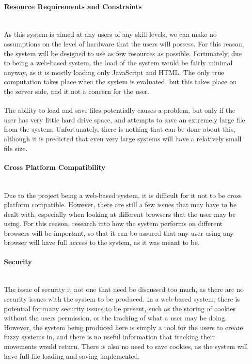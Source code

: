 \paragraph{Resource Requirements and Constraints}\ \\
As this system is aimed at any users of any skill levels, we can make no assumptions on the level of hardware that the users will possess. For this reason, the system will be designed to use as few resources as possible. Fortunately, due to being a web-based system, the load of the system would be fairly minimal anyway, as it is mostly loading only JavaScript and HTML. The only true computation takes place when the system is evaluated, but this takes place on the server side, and it not a concern for the user.\ \\
\ \\
The ability to load and save files potentially causes a problem, but only if the user has very little hard drive space, and attempts to save an extremely large file from the system. Unfortunately, there is nothing that can be done about this, although it is predicted that even very large systems will have a relatively small file size.


\paragraph{Cross Platform Compatibility}\ \\
Due to the project being a web-based system, it is difficult for it not to be cross platform compatible. However, there are still a few issues that may have to be dealt with, especially when looking at different browsers that the user may be using. For this reason, research into how the system performs on different browsers will be important, so that it can be assured that any user using any browser will have full access to the system, as it was meant to be.

\paragraph{Security}\ \\
The issue of security it not one that need be discussed too much, as there are no security issues with the system to be produced. In a web-based system, there is potential for many security issues to be present, such as the storing of cookies without the users permission, or the tracking of what a user may be doing. However, the system being produced here is simply a tool for the users to create fuzzy systems in, and there is no useful information that tracking their movements would return. There is also no need to save cookies, as the system will have full file loading and saving implemented.

